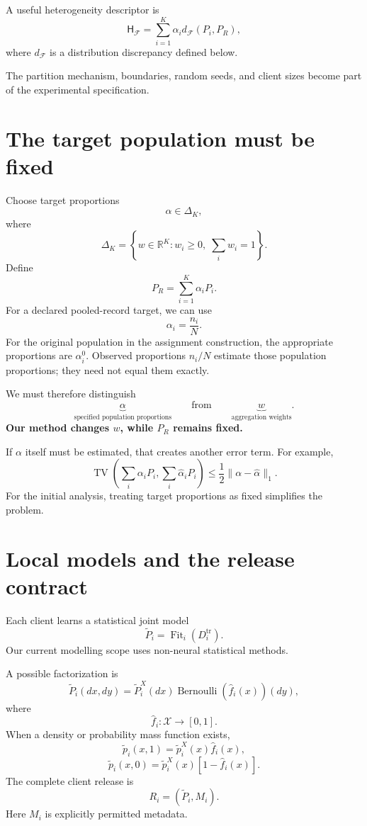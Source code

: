 \documentclass[11pt,a4paper]{article}
\begin{document}
A useful heterogeneity descriptor is
\[
\mathsf H_{\mathcal F}=\sum_{i=1}^{K}\alpha_i d_{\mathcal F}(P_i,P_R),
\]
where $d_{\mathcal F}$ is a distribution discrepancy defined below.

The partition mechanism, boundaries, random seeds, and client sizes become part of the experimental specification.

\section{The target population must be fixed}
Choose target proportions
\[
\alpha\in\Delta_K,
\]
where
\[
\Delta_K=\left\{w\in\mathbb R^K:w_i\geq0,\;\sum_iw_i=1\right\}.
\]
Define
\[
\boxed{P_R=\sum_{i=1}^{K}\alpha_iP_i.}
\]
For a declared pooled-record target, we can use
\[
\alpha_i=\frac{n_i}{N}.
\]
For the original population in the assignment construction, the appropriate proportions are $\alpha_i^0$. Observed proportions $n_i/N$ estimate those population proportions; they need not equal them exactly.

We must therefore distinguish
\[
\underbrace{\alpha}_{\text{specified population proportions}}
\qquad\text{from}\qquad
\underbrace{w}_{\text{aggregation weights}}.
\]
\textbf{Our method changes $w$, while $P_R$ remains fixed.}

If $\alpha$ itself must be estimated, that creates another error term. For example,
\[
\operatorname{TV}\left(\sum_i\alpha_iP_i,\sum_i\widehat\alpha_iP_i\right)
\leq\frac12\|\alpha-\widehat\alpha\|_1.
\]
For the initial analysis, treating target proportions as fixed simplifies the problem.

\section{Local models and the release contract}
Each client learns a statistical joint model
\[
\boxed{\widetilde P_i=\operatorname{Fit}_i(D_i^{\mathrm{tr}}).}
\]
Our current modelling scope uses non-neural statistical methods.

A possible factorization is
\[
\widetilde P_i(dx,dy)=\widetilde P_i^X(dx)
\operatorname{Bernoulli}\left(\widehat f_i(x)\right)(dy),
\]
where
\[
\widehat f_i:\mathcal X\rightarrow[0,1].
\]
When a density or probability mass function exists,
\[
\widetilde p_i(x,1)=\widetilde p_i^X(x)\widehat f_i(x),
\]
\[
\widetilde p_i(x,0)=\widetilde p_i^X(x)\left[1-\widehat f_i(x)\right].
\]
The complete client release is
\[
\boxed{R_i=(\widetilde P_i,M_i).}
\]
Here $M_i$ is explicitly permitted metadata.
\end{document}
